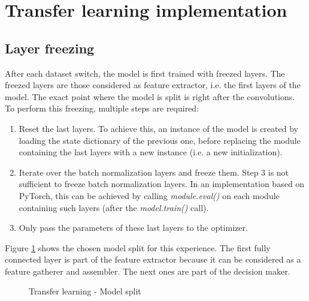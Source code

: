 \section{Transfer learning implementation}
\subsection{Layer freezing}
\setlength{\marginparwidth}{3cm}\leavevmode {}After each dataset switch, the model is first trained with freezed layers. The freezed layers are those considered as feature extractor, i.e. the first layers of the model. The exact point where the model is split is right after the convolutions. To perform this freezing, multiple steps are required:
\begin{enumerate}
	\item Reset the last layers. To achieve this, an instance of the model is created by loading the state dictionary of the previous one, before replacing the module containing the last layers with a new instance (i.e. a new initialization). 
	\item Iterate over the batch normalization layers and freeze them. Step 3 is not sufficient to freeze batch normalization layers. In an implementation based on PyTorch, this can be achieved by calling \textit{module.eval()} on each module containing such layers (after the \textit{model.train()} call). 
	\item Only pass the parameters of these last layers to the optimizer.
\end{enumerate}

\noindent Figure \ref{fig:tl_model_split} shows the chosen model split for this experience. The first fully connected layer is part of the feature extractor because it can be considered as a feature gatherer and assembler. The next ones are part of the decision maker. 

\begin{figure}[!h]
\centering
\noindent
{}
\caption{Transfer learning - Model split}
\label{fig:tl_model_split}
\end{figure}

